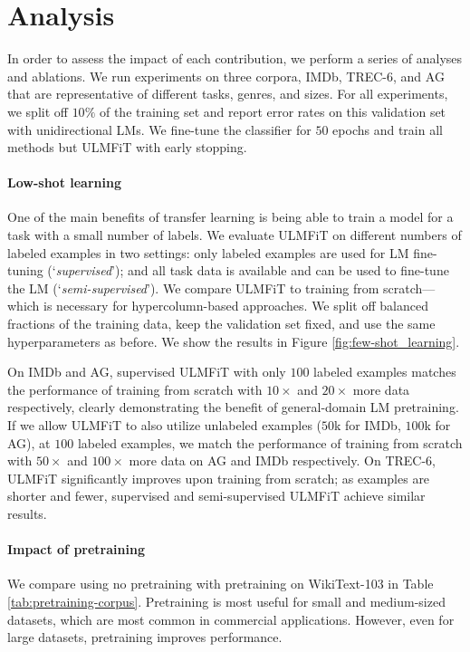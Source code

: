 \documentclass[11pt,a4paper]{article}
\begin{document}
\section{Analysis} \label{sec:analysis}

In order to assess the impact of each contribution, we perform a series of analyses and ablations. We run experiments on three corpora, IMDb, TREC-6, and AG that are representative of different tasks, genres, and sizes. For all experiments, we split off $10\%$ of the training set and report error rates on this validation set with unidirectional LMs. We fine-tune the classifier for $50$ epochs and train all methods but ULMFiT with early stopping.

\paragraph{Low-shot learning} One of the main benefits of transfer learning is being able to train a model for a task with a small number of labels. We evaluate ULMFiT on different numbers of labeled examples in two settings: only labeled examples are used for LM fine-tuning (`\emph{supervised}'); and all task data is available and can be used to fine-tune the LM (`\emph{semi-supervised}'). We compare ULMFiT to training from scratch---which is necessary for hypercolumn-based approaches. We split off balanced fractions of the training data, keep the validation set fixed, and use the same hyperparameters as before. We show the results in Figure \ref{fig:few-shot_learning}.

On IMDb and AG, supervised ULMFiT with only $100$ labeled examples matches the performance of training from scratch with $10\times$ and $20\times$ more data respectively, clearly demonstrating the benefit of general-domain LM pretraining. If we allow ULMFiT to also utilize unlabeled examples ($50$k for IMDb, $100$k for AG), at $100$ labeled examples, we match the performance of training from scratch with $50\times$ and $100\times$ more data on AG and IMDb respectively. On TREC-6, ULMFiT significantly improves upon training from scratch; as examples are shorter and fewer, supervised and semi-supervised ULMFiT achieve similar results.

\paragraph{Impact of pretraining} We compare using no pretraining with pretraining on WikiText-103 \cite{Merity2016} in Table \ref{tab:pretraining-corpus}. Pretraining is most useful for small and medium-sized datasets, which are most common in commercial applications. However, even for large datasets, pretraining improves performance.
\end{document}
